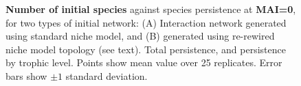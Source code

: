 \begin{figure}
	\centering	
	\setlength{\subfloatlabelskip}{0pt}
	\caption[Number of initial species versus persistence.]{\textbf{Number of initial species} against species persistence at \textbf{MAI=0}, for two types of initial network: (A) Interaction network generated using standard niche model, and (B) generated using re-rewired niche model topology (see text). Total persistence, and persistence by trophic level. Points show mean value over 25 replicates. Error bars show $\pm 1$ standard deviation.}
	\label{fig:nsp_v_comp_mai00}
\end{figure}
